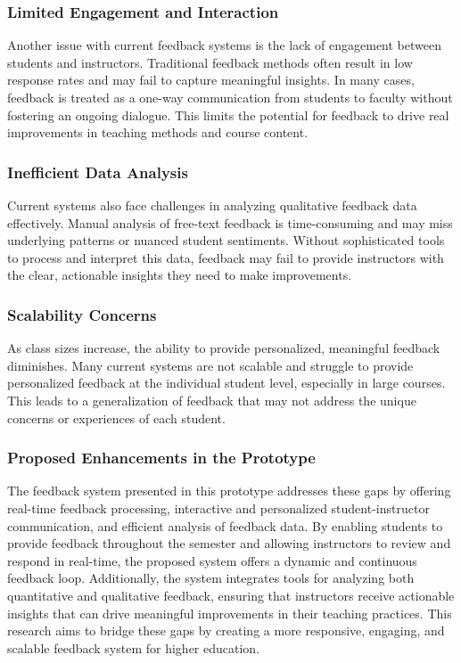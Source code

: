 \documentclass[conference]{IEEEtran}
\begin{document}
\subsubsection{Limited Engagement and Interaction}
Another issue with current feedback systems is the lack of engagement between students and instructors. Traditional feedback methods often result in low response rates and may fail to capture meaningful insights. In many cases, feedback is treated as a one-way communication from students to faculty without fostering an ongoing dialogue. This limits the potential for feedback to drive real improvements in teaching methods and course content.

\subsubsection{Inefficient Data Analysis}
Current systems also face challenges in analyzing qualitative feedback data effectively. Manual analysis of free-text feedback is time-consuming and may miss underlying patterns or nuanced student sentiments. Without sophisticated tools to process and interpret this data, feedback may fail to provide instructors with the clear, actionable insights they need to make improvements.

\subsubsection{Scalability Concerns}
As class sizes increase, the ability to provide personalized, meaningful feedback diminishes. Many current systems are not scalable and struggle to provide personalized feedback at the individual student level, especially in large courses. This leads to a generalization of feedback that may not address the unique concerns or experiences of each student.

\subsubsection{Proposed Enhancements in the Prototype}
The feedback system presented in this prototype addresses these gaps by offering real-time feedback processing, interactive and personalized student-instructor communication, and efficient analysis of feedback data. By enabling students to provide feedback throughout the semester and allowing instructors to review and respond in real-time, the proposed system offers a dynamic and continuous feedback loop. Additionally, the system integrates tools for analyzing both quantitative and qualitative feedback, ensuring that instructors receive actionable insights that can drive meaningful improvements in their teaching practices. This research aims to bridge these gaps by creating a more responsive, engaging, and scalable feedback system for higher education.
\end{document}
